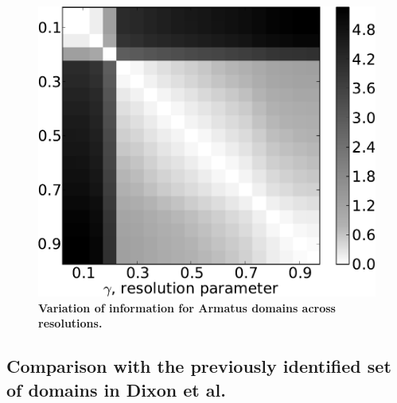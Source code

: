 \documentclass[12pt]{cmuthesis}
\begin{document}

  


  \begin{figure}[ht]
    \centering
    \includegraphics[width=0.5\linewidth]{figures/vi_chr1}
    \caption{\textbf{Variation of information for Armatus domains across resolutions.}}
    \label{fig:armatus:domains_vi}
  \end{figure}


  \subsection{Comparison with the previously identified set of domains in Dixon et al.}
\end{document}
